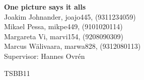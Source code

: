 \documentclass[10pt,twocolumn]{article}
\begin{document}
\begin{titlepage}
  \begin{center}
    
    {\Large\bfseries One picture says it alls} \\ %
    \vspace{2\baselineskip} %
    Joakim Johnander, joajo445, (9311234059)\\
    Mikael Pessa, mikpe449, (9101020114)\\
    Margareta Vi, marvi154, (9208090309) \\
    Marcus Wälivaara, marwa828, (9312080113) \\
    
    Supervisor: Hannes Ovrén

    \vspace{2\baselineskip}

    \Large{TSBB11\\}

    
  \end{center}
\end{titlepage}




\end{document}
